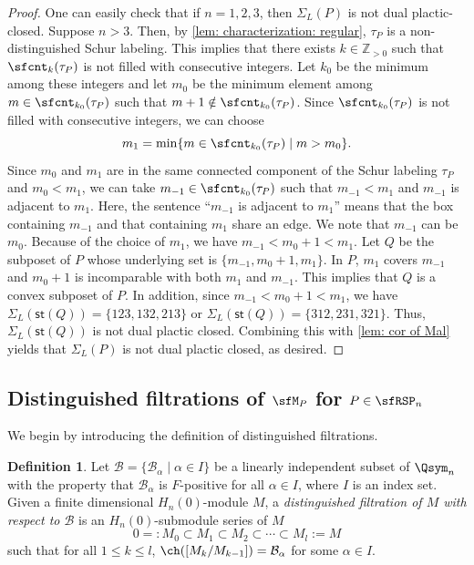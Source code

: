 \documentclass[12pt, reqno]{amsart}
\theoremstyle{definition}
\newtheorem{definition}[theorem]{Definition}
\numberwithin{equation}{section} \numberwithin{figure}{section}
\numberwithin{table}{section}
\def\Z{\mathbb Z}
\begin{document}
\begin{proof}
One can easily check that if $n = 1,2,3$, then $\Sigma_L(P)$ is not dual plactic-closed.
Suppose $n > 3$.
Then, by \cref{lem: characterization: regular},  $\tau_P$ is a non-distinguished Schur labeling.
This implies that there exists $k \in \Z_{>0}$ such that $\sfcnt_{k}(\tau_P)$ is not filled with consecutive integers.
Let $k_0$ be the minimum among these integers and let $m_0$ be the minimum element among $m \in \sfcnt_{k_0}(\tau_P)$ such that $m + 1 \notin \sfcnt_{k_0}(\tau_P)$.
Since $\sfcnt_{k_0}(\tau_P)$ is not filled with consecutive integers, 
we can choose 
$$
m_1 = \min \{m \in \sfcnt_{k_0}(\tau_P) \mid m > m_0\}.
$$
Since $m_0$ and $m_1$ are in the same connected component of the Schur labeling $\tau_P$ and $m_0 < m_1$, we can take $m_{-1} \in \sfcnt_{k_0}(\tau_P)$ such that $m_{-1} < m_1$ and $m_{-1}$ is adjacent to $m_1$. Here, the sentence ``$m_{-1}$ is adjacent to $m_1$'' means that the box containing $m_{-1}$ and that containing $m_{1}$ share an edge.
We note that $m_{-1}$ can be $m_0$.
Because of the choice of $m_1$, we have $m_{-1} < m_0+1 < m_1$.
Let $Q$ be the subposet of $P$ whose underlying set is $\{m_{-1}, m_0 + 1, m_1\}$.
In $P$, $m_1$ covers $m_{-1}$ and $m_0 + 1$ is incomparable with both $m_1$ and $m_{-1}$.
This implies that $Q$ is a convex subposet of $P$. 
In addition, since $m_{-1} < m_0 + 1 < m_1$, we have $\Sigma_L(\mathsf{st}(Q)) = \{123,132,213\}$ or $\Sigma_L(\mathsf{st}(Q)) = \{312,231,321\}$.
Thus, $\Sigma_L(\mathsf{st}(Q))$ is not dual plactic closed.
Combining this with \cref{lem: cor of Mal} yields that $\Sigma_L(P)$ is not dual plactic closed, as desired.
\end{proof}




\subsection{Distinguished filtrations of $\sfM_P$ for $P \in \sfRSP_n$}\label{subsec: distinguished filt}

We begin by introducing the definition of distinguished filtrations.

\begin{definition}\label{def: dist filt}
Let $\mathcal{B} = \{\mathcal{B}_\alpha \mid \alpha \in I\}$ be a linearly independent subset of $\Qsym_n$ 
with the property that  $\mathcal{B}_\alpha$ is $F$-positive for all $\alpha \in I$,
where $I$ is an index set.
Given a finite dimensional $H_n(0)$-module $M$,
a \emph{distinguished filtration of $M$ with respect to $\mathcal{B}$} is an $H_n(0)$-submodule series  of $M$ 
\[
0 =: M_0 \subset M_1 \subset M_2 \subset \cdots \subset M_l := M
\]
such that for all $1 \leq k \leq l$, $\ch([M_k / M_{k-1}]) = \mathcal{B}_\alpha$ for some $\alpha \in I$.
\end{definition}
\end{document}
